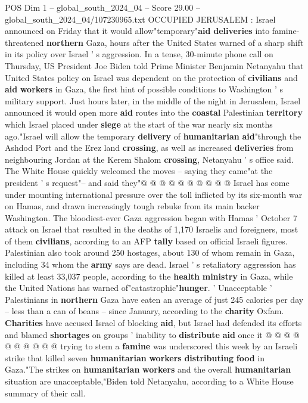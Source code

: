 \begin{textsample}{POS Dim 1 – global\_south\_2024\_04 – Score 29.00 – global\_south\_2024\_04/107230965.txt}  \label{ex:f1_pos_148}
OCCUPIED JERUSALEM : Israel announced on Friday that it would allow"temporary"\textbf{aid} \textbf{deliveries} into famine-threatened \textbf{northern} Gaza, hours after the United States warned of a sharp shift in its policy over Israel ' s aggression.
In a tense, 30-minute phone call on Thursday, US President Joe Biden told Prime Minister Benjamin Netanyahu that United States policy on Israel was dependent on the protection of \textbf{civilians} and \textbf{aid} \textbf{workers} in Gaza, the first hint of possible conditions to Washington ' s military support.
Just hours later, in the middle of the night in Jerusalem, Israel announced it would open more \textbf{aid} routes into the \textbf{coastal} Palestinian \textbf{territory} which Israel placed under \textbf{siege} at the start of the war nearly six months ago."Israel will allow the temporary \textbf{delivery} of \textbf{humanitarian} \textbf{aid}"through the Ashdod Port and the Erez land \textbf{crossing}, as well as increased \textbf{deliveries} from neighbouring Jordan at the Kerem Shalom \textbf{crossing}, Netanyahu ' s office said.
The White House quickly welcomed the moves -- saying they came"at the president ' s request"-- and said they"@ @ @ @ @ @ @ @ @ @ Israel has come under mounting international pressure over the toll inflicted by its six-month war on Hamas, and drawn increasingly tough rebuke from its main backer Washington.
The bloodiest-ever Gaza aggression began with Hamas ' October 7 attack on Israel that resulted in the deaths of 1,170 Israelis and foreigners, most of them \textbf{civilians}, according to an AFP \textbf{tally} based on official Israeli figures.
Palestinian also took around 250 hostages, about 130 of whom remain in Gaza, including 34 whom the \textbf{army} says are dead.
Israel ' s retaliatory aggression has killed at least 33,037 people, according to the \textbf{health} \textbf{ministry} in Gaza, while the United Nations has warned of"catastrophic"\textbf{hunger}. ' Unacceptable ' Palestinians in \textbf{northern} Gaza have eaten an average of just 245 calories per day -- less than a can of beans -- since January, according to the \textbf{charity} Oxfam. \textbf{Charities} have accused Israel of blocking \textbf{aid}, but Israel had defended its efforts and blamed \textbf{shortages} on groups ' inability to \textbf{distribute} \textbf{aid} once it @ @ @ @ @ @ @ @ @ @ trying to stem a \textbf{famine} was underscored this week by an Israeli strike that killed seven \textbf{humanitarian} \textbf{workers} \textbf{distributing} \textbf{food} in Gaza."The strikes on \textbf{humanitarian} \textbf{workers} and the overall \textbf{humanitarian} situation are unacceptable,"Biden told Netanyahu, according to a White House summary of their call.

\end{textsample}
